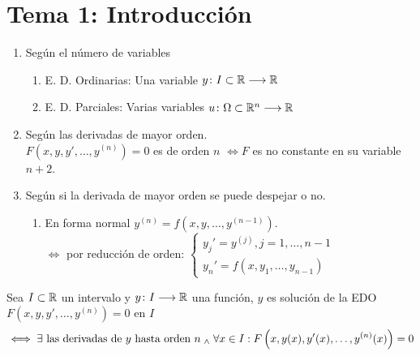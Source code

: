\section{Tema 1: Introducción}
\begin{defn}
    \item[] 
    \begin{enumerate}[topsep=1pt, itemsep=1pt,parsep=3pt]
        \item Según el número de variables
        \begin{enumerate}[topsep=1pt, itemsep=1pt,parsep=3pt]
            \item E. D. Ordinarias: Una variable $y \colon I\subset \mathbb{R} \longrightarrow \mathbb{R}$
            \item E. D. Parciales: Varias variables $u \colon \Omega\subset \mathbb{R}^{n} \longrightarrow \mathbb{R}$
        \end{enumerate}
        \item Según las derivadas de mayor orden. \\$F\left(x,y,y', \dots, y^{(n)}\right)=0$ es de orden $n$ \(\iff F\) es no constante en su variable $n+2$.
        \item Según si la derivada de mayor orden se puede despejar o no.
        \begin{enumerate}[topsep=1pt, itemsep=1pt,parsep=3pt]
            \item En forma normal $y^{(n)} = f(x, y, \dots, y^{(n-1)})$.
            \\ $\iff$ por reducción de orden:
            $\begin{cases}
                y_j' = y^{(j)}, j=1, \dots, n-1\\
                y_n'=f(x,y_1, \dots, y_{n-1})
            \end{cases}$
        \end{enumerate}
    \end{enumerate}    
\end{defn}
\begin{defn}
    Sea $I\subset \mathbb{R}$ un intervalo y $y \colon I \longrightarrow \mathbb{R}$ una función, $y$ es solución de la EDO $F\left(x,y,y', \dots, y^{(n)}\right)=0$ en $I$
    \[\iff \exists \text{ las derivadas de } y \text{ hasta orden } n \; _{\wedge} \; \forall x \in I : F\left(x,y(x),y'(x), \dots, y^{(n)}(x)\right)=0\]
\end{defn}
